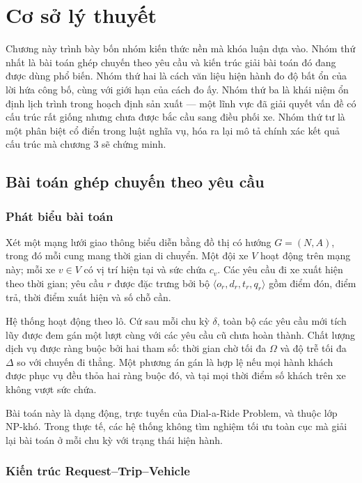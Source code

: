 \chapter{Cơ sở lý thuyết}

Chương này trình bày bốn nhóm kiến thức nền mà khóa luận dựa vào. Nhóm thứ nhất là bài toán
ghép chuyến theo yêu cầu và kiến trúc giải bài toán đó đang được dùng phổ biến. Nhóm thứ hai
là cách văn liệu hiện hành đo độ bất ổn của lời hứa công bố, cùng với giới hạn của cách đo ấy.
Nhóm thứ ba là khái niệm ổn định lịch trình trong hoạch định sản xuất --- một lĩnh vực đã giải
quyết vấn đề có cấu trúc rất giống nhưng chưa được bắc cầu sang điều phối xe. Nhóm thứ tư là
một phân biệt cổ điển trong luật nghĩa vụ, hóa ra lại mô tả chính xác kết quả cấu trúc mà
chương 3 sẽ chứng minh.

\section{Bài toán ghép chuyến theo yêu cầu}

\subsection{Phát biểu bài toán}

Xét một mạng lưới giao thông biểu diễn bằng đồ thị có hướng $G=(N,A)$, trong đó mỗi cung mang
thời gian di chuyển. Một đội xe $V$ hoạt động trên mạng này; mỗi xe $v \in V$ có vị trí hiện
tại và sức chứa $c_v$. Các yêu cầu đi xe xuất hiện theo thời gian; yêu cầu $r$ được đặc trưng
bởi bộ $\langle o_r, d_r, t_r, q_r \rangle$ gồm điểm đón, điểm trả, thời điểm xuất hiện và số
chỗ cần.

Hệ thống hoạt động theo lô. Cứ sau mỗi chu kỳ $\delta$, toàn bộ các yêu cầu mới tích lũy được
đem gán một lượt cùng với các yêu cầu cũ chưa hoàn thành. Chất lượng dịch vụ được ràng buộc
bởi hai tham số: thời gian chờ tối đa $\Omega$ và độ trễ tối đa $\Delta$ so với chuyến đi
thẳng. Một phương án gán là hợp lệ nếu mọi hành khách được phục vụ đều thỏa hai ràng buộc đó,
và tại mọi thời điểm số khách trên xe không vượt sức chứa.

Bài toán này là dạng động, trực tuyến của Dial-a-Ride Problem, và thuộc lớp NP-khó. Trong thực
tế, các hệ thống không tìm nghiệm tối ưu toàn cục mà giải lại bài toán ở mỗi chu kỳ với trạng
thái hiện hành.

\subsection{Kiến trúc Request--Trip--Vehicle}

